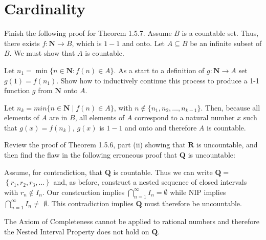 \section{Cardinality}

\begin{exercise}
  Finish the following proof for Theorem 1.5.7.
  Assume $B$ is a countable set. Thus, there exists $f: \mathbf{N} \rightarrow B$, which is $1-1$ and onto. Let $A \subseteq B$ be an infinite subset of $B$. We must show that $A$ is countable.

  Let $n_{1}=\min \{n \in \mathbf{N}: f(n) \in A\}$.
  As a start to a definition of $g: \mathbf{N} \rightarrow A$ set $g(1)=f\left(n_{1}\right)$.
  Show how to inductively continue this process to produce a 1-1 function $g$ from $\mathbf{N}$ onto $A$.
\end{exercise}

\begin{solution}
  \BAD
  Let $n_k=min\{n\in\mathbf{N}\mid f(n)\in A\}$, with $n\notin\{n_1, n_2, \ldots, n_{k-1}\}$. Then, because all elements of $A$ are in $B$, all elements of $A$ correspond to a natural number $x$ such that $g(x)=f(n_k)$, $g(x)$ is $1-1$ and onto and therefore $A$ is countable.
\end{solution}

\begin{exercise}
  Review the proof of Theorem 1.5.6, part (ii) showing that $\mathbf{R}$ is uncountable, and then find the flaw in the following erroneous proof that $\mathbf{Q}$ is uncountable:

  Assume, for contradiction, that $\mathbf{Q}$ is countable. Thus we can write $\mathbf{Q}=$ $\left\{r_{1}, r_{2}, r_{3}, \ldots\right\}$ and, as before, construct a nested sequence of closed intervals with $r_{n} \notin I_{n}$. Our construction implies $\bigcap_{n=1}^{\infty} I_{n}=\emptyset$ while NIP implies $\bigcap_{n=1}^{\infty} I_{n} \neq$ $\emptyset$. This contradiction implies $\mathbf{Q}$ must therefore be uncountable.
\end{exercise}

\begin{solution}
  The Axiom of Completeness cannot be applied to rational numbers and therefore the Nested Interval Property does not hold on $\mathbf{Q}$.
\end{solution}

